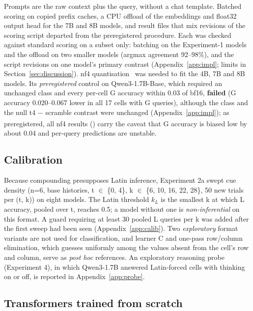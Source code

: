 \documentclass[11pt]{article}
\begin{document}
Prompts are the raw context plus the query, without a chat template. Batched scoring on copied prefix caches, a CPU offload of the embeddings and float32 output head for the 7B and 8B models, and result files that mix revisions of the scoring script departed from the preregistered procedure. Each was checked against standard scoring on a subset only: batching on the Experiment-1 models and the offload on two smaller models (argmax agreement 92--98\%), and the script revisions on one model's primary contrast (Appendix~\ref{app:impl}; limits in Section~\ref{sec:discussion}). nf4 quantisation~\cite{dettmers2023qlora} was needed to fit the 4B, 7B and 8B models. Its \emph{preregistered} control on Qwen3-1.7B-Base, which required an unchanged class and every per-cell G accuracy within 0.03 of bf16, \textbf{failed} (G accuracy 0.020--0.067 lower in all 17 cells with G queries), although the class and the null t4 $-$ scramble contrast were unchanged (Appendix~\ref{app:impl}); as preregistered, all nf4 results (\textsuperscript{\dag}) carry the caveat that G accuracy is biased low by about 0.04 and per-query predictions are unstable.

\subsection{Calibration}\label{sec:calib}

Because compounding presupposes Latin inference, Experiment 2a swept cue density (n=6, base histories, t $\in$ \{0, 4\}, k $\in$ \{6, 10, 16, 22, 28\}, 50 new trials per (t, k)) on eight models. The Latin threshold $k_L$ is the smallest k at which L accuracy, pooled over t, reaches 0.5; a model without one is \emph{non-inferential} on this format. A guard requiring at least 30 pooled L queries per k was added after the first sweep had been seen (Appendix~\ref{app:calib}). Two \emph{exploratory} format variants are not used for classification, and learner C and one-pass row/column elimination, which guesses uniformly among the values absent from the cell's row and column, serve as \emph{post hoc} references. An exploratory reasoning probe (Experiment 4), in which Qwen3-1.7B answered Latin-forced cells with thinking on or off, is reported in Appendix~\ref{app:probe}.

\subsection{Transformers trained from scratch}\label{sec:trained}
\end{document}
